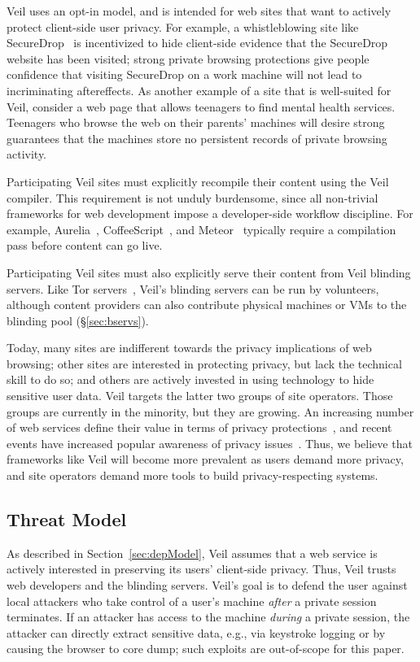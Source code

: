 Veil uses an opt-in model, and is intended
for web sites that want to actively protect
client-side user privacy. For example, a
whistleblowing site like SecureDrop~\cite{secureDrop}
is incentivized to hide client-side evidence
that the SecureDrop website has been visited;
strong private browsing protections give people
confidence that visiting SecureDrop on a work
machine will not lead to incriminating aftereffects.
As another example of a site that is well-suited
for Veil, consider a web page that allows
teenagers to find mental health services. Teenagers
who browse the web on their parents' machines 
will desire strong guarantees that the
machines store no persistent records of private
browsing activity.

Participating Veil sites must explicitly recompile
their content using the Veil compiler. This
requirement is not unduly burdensome, since
all non-trivial frameworks for web development impose
a developer-side workflow discipline. For example,
Aurelia~\cite{aurelia}, CoffeeScript~\cite{coffeeScript}, and
Meteor~\cite{meteor} typically require a
compilation pass before content can go live.

Participating Veil sites must also explicitly serve
their content from Veil blinding servers. Like
Tor servers~\cite{tor}, Veil's blinding servers
can be run by volunteers, although content providers
can also contribute physical machines or VMs to
the blinding pool (\S\ref{sec:bservs}).

Today, many sites are indifferent
towards the privacy implications of web browsing;
other sites are interested in protecting privacy,
but lack the technical skill to do so; and others
are actively invested in using technology to hide
sensitive user data. Veil targets the latter
two groups of site operators. Those groups are
currently in the minority, but they are growing.
An increasing number of web services define their
value in terms of privacy protections~\cite{duckduck,enigma,privio,privly},
and recent events have increased popular
awareness of privacy issues~\cite{torAfterSnowden}.
Thus, we believe that frameworks like Veil will
become more prevalent as users demand more
privacy, and site operators demand more tools to
build privacy-respecting systems.

\subsection{Threat Model}
\label{sec:threatModel}

As described in Section~\ref{sec:depModel}, Veil
assumes that a web service is actively interested
in preserving its users' client-side privacy.
Thus, Veil trusts web developers and the blinding servers.
Veil's goal is to defend the user against local
attackers who take control of a user's machine
\textit{after} a private session terminates. If an
attacker has access to the machine \emph{during} a
private session, the attacker can directly extract
sensitive data, e.g., via keystroke logging or by
causing the browser to core dump; such exploits are
out-of-scope for this paper.

